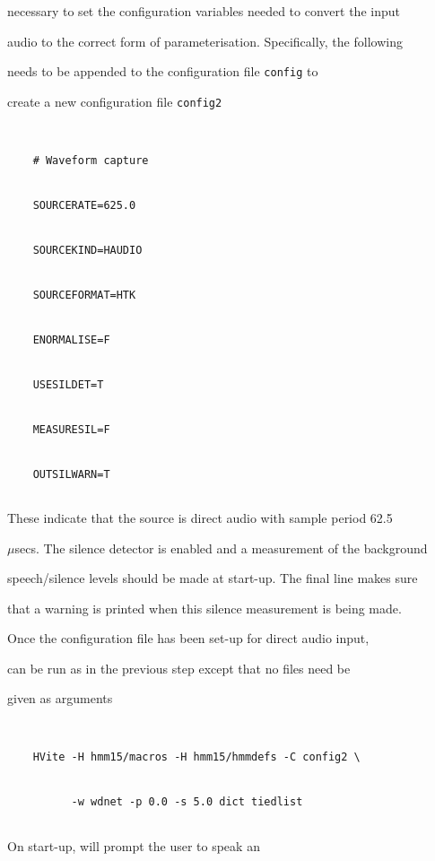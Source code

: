 necessary to set the configuration variables needed to convert the input


audio to the correct form of  parameterisation.  Specifically, the following


needs to be appended to the configuration file \texttt{config} to


create a new configuration file \texttt{config2}


\begin{verbatim}


    # Waveform capture


    SOURCERATE=625.0


    SOURCEKIND=HAUDIO


    SOURCEFORMAT=HTK


    ENORMALISE=F


    USESILDET=T


    MEASURESIL=F


    OUTSILWARN=T


\end{verbatim}


These indicate that the source is direct audio with sample period 62.5


$\mu$secs.  The silence detector is enabled and a measurement of the background


speech/silence levels should be made at start-up.  The final line makes sure


that a warning is printed when this silence measurement is being made.





Once the configuration file has been set-up for direct audio input,


 can be run as in the previous step except that no files need be


given as arguments





\begin{verbatim}


    HVite -H hmm15/macros -H hmm15/hmmdefs -C config2 \


          -w wdnet -p 0.0 -s 5.0 dict tiedlist


\end{verbatim}





On start-up,  will prompt the user to speak an


